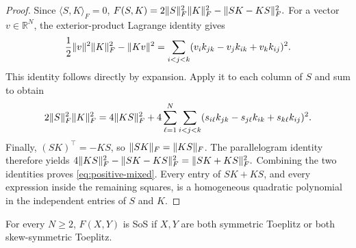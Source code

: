 \begin{proof}

Since $\langle S,K\rangle_F=0$,
$
 F(S,K)=2\lVert S\rVert_F^2\lVert K\rVert_F^2-\lVert SK-KS\rVert_F^2.
$
For a vector $v\in\mathbb R^N$, the exterior-product Lagrange
identity gives
\[
 \frac12\lVert v\rVert^2\lVert K\rVert_F^2-\lVert Kv\rVert^2
 =
 \sum_{i<j<k}
 (v_i k_{jk}-v_j k_{ik}+v_k k_{ij})^2.
\]
This identity follows directly by expansion.
Apply it to each column of $S$ and sum to obtain
\[
 2\lVert S\rVert_F^2\lVert K\rVert_F^2
 =
 4\lVert KS\rVert_F^2
 +
 4\sum_{\ell=1}^N\sum_{i<j<k}
 (s_{i\ell}k_{jk}-s_{j\ell}k_{ik}+s_{k\ell}k_{ij})^2.
\]
Finally, $(SK)^\top=-KS$, so
$\lVert SK\rVert_F=\lVert KS\rVert_F$.
The parallelogram identity therefore yields
$
 4\lVert KS\rVert_F^2-\lVert SK-KS\rVert_F^2
 =
 \lVert SK+KS\rVert_F^2.
$
Combining the two identities proves
\eqref{eq:positive-mixed}.
Every entry of $SK+KS$, and every expression inside the
remaining squares, is a homogeneous quadratic polynomial
in the independent entries of $S$ and $K$.
\end{proof}

\begin{proposition}
\label{prop:same-symmetry}
For every $N\ge2$, $F(X,Y)$ is SoS if $X,Y$ are both symmetric
Toeplitz or both skew-symmetric Toeplitz.
\end{proposition}

